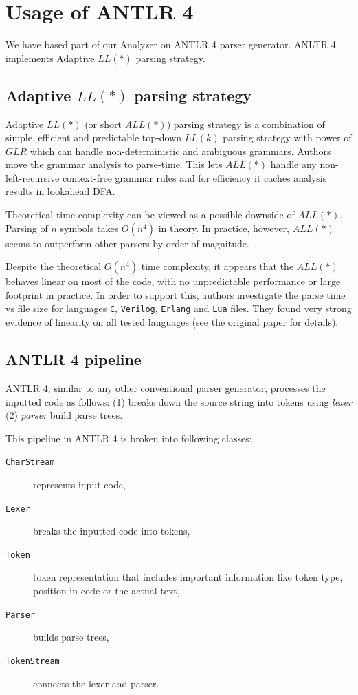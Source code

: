 

\section{Usage of ANTLR 4}
\label{antlr}
We have based part of our Analyzer on ANTLR 4 parser generator. ANLTR 4 implements Adaptive $LL(*)$ \cite{parr2014adaptive} parsing strategy.

\subsection{Adaptive $LL(*)$ parsing strategy}
Adaptive $LL(*)$ (or short $ALL(*)$) parsing strategy is a combination of simple, efficient and predictable top-down $LL(k)$ parsing strategy with power of $GLR$ which can handle non-deterministic and ambiguous grammars. 
Authors move the grammar analysis to parse-time. This lets $ALL(*)$ handle any non-left-recursive context-free grammar rules and for efficiency it caches analysis results in lookahead DFA.

Theoretical time complexity can be viewed as a possible downside of $ALL(*)$. Parsing of $n$ symbols takes $O(n^4)$ in theory. In practice, however, $ALL(*)$ seems to outperform other parsers by order of magnitude.

Despite the theoretical $O(n^4)$ time complexity, it appears that the $ALL(*)$ behaves linear on most of the code, with no unpredictable performance or large footprint in practice. In order to support this, authors investigate the parse time vs file size for languages \texttt{C}, \texttt{Verilog}, \texttt{Erlang} and \texttt{Lua} files. They found very strong evidence of linearity on all tested languages (see the original paper for details).

\subsection{ANTLR 4 pipeline}

ANTLR 4, similar to any other conventional parser generator, processes the inputted code as follows: (1) breaks down the source string into tokens using \textit{lexer} (2) \textit{parser} build parse trees. 

This pipeline in ANTLR 4 is broken into following classes: 

\begin{description}
	\item[\texttt{CharStream}] represents input code,
	\item[\texttt{Lexer}] breaks the inputted code into tokens,
	\item[\texttt{Token}] token representation that includes important information like token type, position in code or the actual text,
	\item[\texttt{Parser}] builds parse trees,
	\item[\texttt{TokenStream}] connects the lexer and parser.
\end{description}

